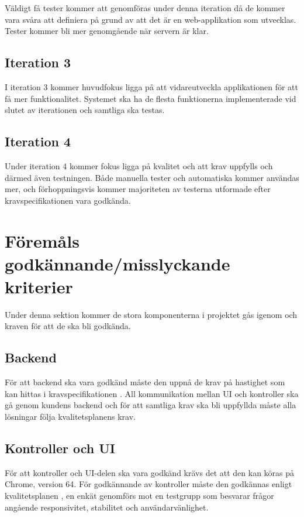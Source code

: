 	Väldigt få tester kommer att genomföras under denna iteration då de kommer vara svåra att definiera på grund av att det är en web-applikation som utvecklas. Tester kommer bli mer genomgående när servern är klar.

\subsection{Iteration 3}
	I iteration 3 kommer huvudfokus ligga på att vidareutveckla applikationen för att få mer funktionalitet. Systemet ska ha de flesta funktionerna implementerade vid slutet av iterationen och samtliga ska testas.
\subsection{Iteration 4}
	Under iteration 4 kommer fokus ligga på kvalitet och att krav uppfylls och därmed även testningen. Både manuella tester och automatiska kommer användas mer, och förhoppningsvis kommer majoriteten av testerna utformade efter kravspecifikationen vara godkända. 




\section{Föremåls godkännande/misslyckande kriterier}
	Under denna sektion kommer de stora komponenterna i projektet gås igenom och kraven för att de ska bli godkända.

	\subsection{Backend}
		För att backend ska vara godkänd måste den uppnå de krav på hastighet som kan hittas i kravspecifikationen \cite{bib-kravspec}. All kommunikation mellan UI och kontroller ska gå genom kundens backend och för att samtliga krav ska bli uppfyllda måste alla lösningar följa kvalitetsplanens  \cite{bib-kvalitetsplan} krav.

	\subsection{Kontroller och UI}
		För att kontroller och UI-delen ska vara godkänd krävs det att den kan köras på Chrome, version 64. För godkännande av kontroller måste den godkännas enligt kvalitetsplanen \cite{bib-kvalitetsplan}, en enkät genomförs mot en testgrupp som besvarar frågor angående responsivitet, stabilitet och användarvänlighet.



